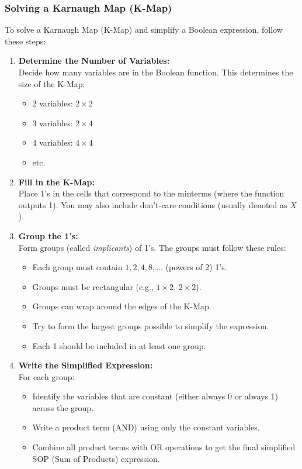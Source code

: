 \subsubsection{Solving a Karnaugh Map (K-Map)}

To solve a Karnaugh Map (K-Map) and simplify a Boolean expression, follow these steps:

\begin{enumerate}
	\item \textbf{Determine the Number of Variables:} \\
	      Decide how many variables are in the Boolean function. This determines the size of the K-Map:
	      \begin{itemize}
		      \item 2 variables: $2 \times 2$
		      \item 3 variables: $2 \times 4$
		      \item 4 variables: $4 \times 4$
		      \item etc.
	      \end{itemize}

	\item \textbf{Fill in the K-Map:} \\
	      Place 1's in the cells that correspond to the minterms (where the function outputs 1). You may also include don't-care conditions (usually denoted as $X$).

	\item \textbf{Group the 1's:} \\
	      Form groups (called \emph{implicants}) of 1's. The groups must follow these rules:
	      \begin{itemize}
		      \item Each group must contain $1, 2, 4, 8, \ldots$ (powers of 2) 1's.
		      \item Groups must be rectangular (e.g., $1 \times 2$, $2 \times 2$).
		      \item Groups can wrap around the edges of the K-Map.
		      \item Try to form the largest groups possible to simplify the expression.
		      \item Each 1 should be included in at least one group.
	      \end{itemize}

	\item \textbf{Write the Simplified Expression:} \\
	      For each group:
	      \begin{itemize}
		      \item Identify the variables that are constant (either always 0 or always 1) across the group.
		      \item Write a product term (AND) using only the constant variables.
		      \item Combine all product terms with OR operations to get the final simplified SOP (Sum of Products) expression.
	      \end{itemize}
\end{enumerate}

